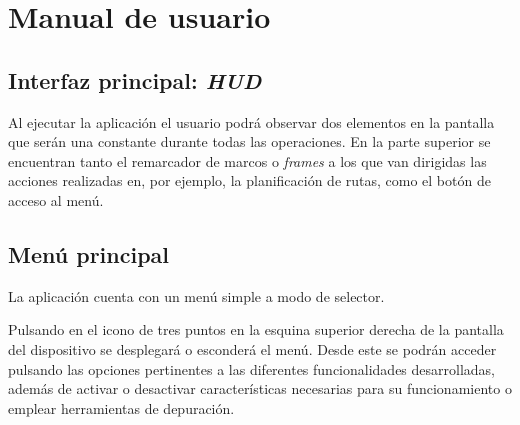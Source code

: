 \chapter{Manual de usuario} \label{chapter:manual_uso}

\section{Interfaz principal: \textit{HUD}}
Al ejecutar la aplicación el usuario podrá observar dos elementos en la pantalla que serán una constante durante todas las operaciones.
En la parte superior se encuentran tanto el remarcador de marcos o \textit{frames} a los que van dirigidas las acciones 
realizadas en, por ejemplo, la planificación de rutas, como el botón de acceso al menú.

\section{Menú principal}
La aplicación cuenta con un menú simple a modo de selector.

Pulsando en el icono de tres puntos en la esquina superior derecha de la pantalla del dispositivo se desplegará o 
esconderá el menú. Desde este se podrán acceder pulsando 
las opciones pertinentes a las diferentes funcionalidades desarrolladas, además de activar o desactivar
características necesarias para su funcionamiento o emplear herramientas de depuración.

